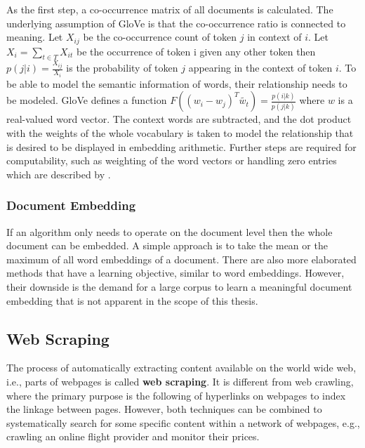 As the first step, a co-occurrence matrix of all documents is calculated. The underlying assumption of GloVe is that the co-occurrence ratio is connected to meaning.
Let $X_{ij}$ be the co-occurrence count of token $j$ in context of $i$. Let $X_i = \sum_{t \in T} X_{it}$ be the occurrence of token i given any other token then $p(j|i) = \frac{X_{ij}}{X_i}$ is the probability of token $j$ appearing in the context of token $i$.
To be able to model the semantic information of words, their relationship needs to be modeled. GloVe defines a function $F((w_i-w_j)^T \widetilde{w_t}) = \frac{p(i|k)}{p(j|k)}$ where $w$ is a real-valued word vector. The context words are subtracted, and the dot product with the weights of the whole vocabulary is taken to model the relationship that is desired to be displayed in embedding arithmetic. Further steps are required for computability, such as weighting of the word vectors or handling zero entries which are described by \cite{Pennington2014}.


\subsubsection{Document Embedding}

If an algorithm only needs to operate on the document level then the whole document can be embedded. A simple approach is to take the mean or the maximum of all word embeddings of a document. There are also more elaborated methods \citep{Wu2018, Liu2018, Andrew2015} that have a learning objective, similar to word embeddings. However, their downside is the demand for a large corpus to learn a meaningful document embedding that is not apparent in the scope of this thesis.

\subsection{Web Scraping}

The process of automatically extracting content available on the world wide web, i.e., parts of webpages is called \textbf{web scraping}. It is different from web crawling, where the primary purpose is the following of hyperlinks on webpages to index the linkage between pages. However, both techniques can be combined to systematically search for some specific content within a network of webpages, e.g., crawling an online flight provider and monitor their prices.

